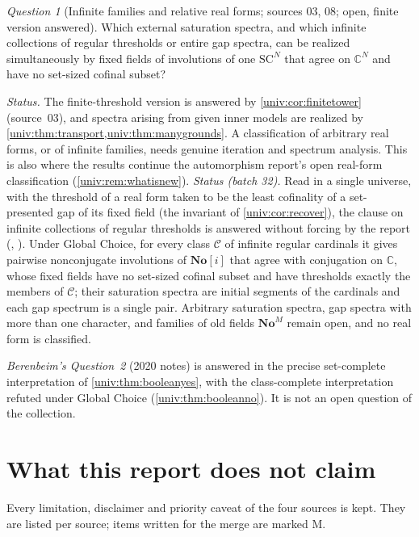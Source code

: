 \documentclass[11pt,letterpaper]{article}
\numberwithin{equation}{section}
\theoremstyle{definition}
\theoremstyle{remark}
\newtheorem{question}[question]{Question}
\newcommand{\No}{\mathbf{No}}
\newcommand{\SC}{\mathrm{SC}}
\newcommand{\NoM}{\No^{M}}
\newcommand{\SCN}{\SC^{N}}
\newcommand{\C}{\mathbb C}
\begin{document}
\begin{question}[Infinite families and relative real forms; sources 03, 08; open, finite version answered]\label{univ:q:families}
Which external saturation spectra, and which infinite collections of regular
thresholds or entire gap spectra, can be realized simultaneously by fixed fields
of involutions of one $\SCN$ that agree on $\C^N$ and have no set-sized cofinal
subset?
\end{question}
\emph{Status.} The finite-threshold version is answered by
\cref{univ:cor:finitetower} (source~03), and spectra arising from given inner
models are realized by \cref{univ:thm:transport,univ:thm:manygrounds}. A
classification of arbitrary real forms, or of infinite families, needs genuine
iteration and spectrum analysis. This is also where the results continue the
automorphism report's open real-form classification (\cref{univ:rem:whatisnew}).
\emph{Status (batch 32).} Read in a single universe, with the threshold of a
real form taken to be the least cofinality of a set-presented gap of its fixed
field (the invariant of \cref{univ:cor:recover}), the clause on infinite
collections of regular thresholds is answered without forcing by the report
 (,
). Under Global Choice, for every class $\mathcal C$ of
infinite regular cardinals it gives pairwise nonconjugate involutions of
$\No[i]$ that agree with conjugation on $\C$, whose fixed fields have no
set-sized cofinal subset and have thresholds exactly the members of
$\mathcal C$; their saturation spectra are initial segments of the cardinals
and each gap spectrum is a single pair. Arbitrary saturation spectra, gap
spectra with more than one character, and families of old fields $\NoM$ remain
open, and no real form is classified.

\emph{Berenbeim's Question~2} (2020 notes) is answered in the precise
set-complete interpretation of \cref{univ:thm:booleanyes}, with the
class-complete interpretation refuted under Global Choice
(\cref{univ:thm:booleanno}). It is not an open question of the collection.

\section{What this report does not claim}\label{univ:sec:nonclaims}

Every limitation, disclaimer and priority caveat of the four sources is kept.
They are listed per source; items written for the merge are marked M.
\end{document}
